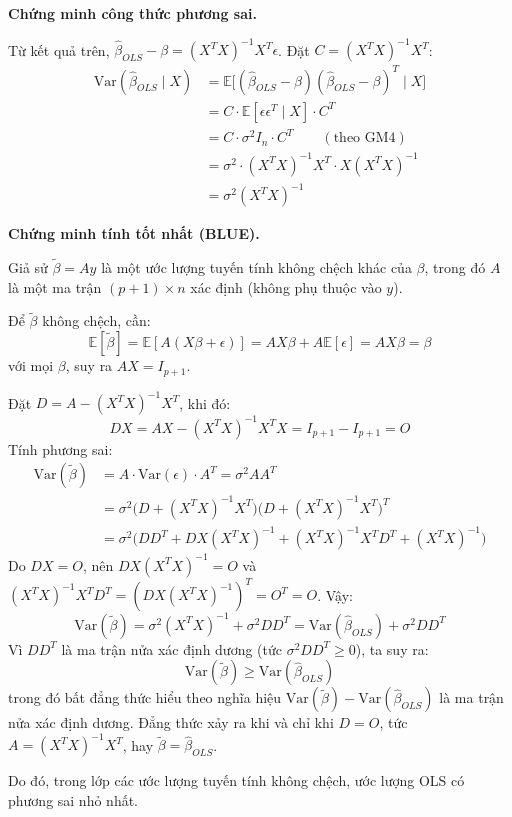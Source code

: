 \documentclass[a4paper]{article}
\begin{document}
\textbf{Chứng minh công thức phương sai.}

Từ kết quả trên, $\hat{\beta}_{OLS} - \beta = (X^TX)^{-1}X^T\epsilon$. Đặt $C = (X^TX)^{-1}X^T$:
\begin{align*}
\text{Var}(\hat{\beta}_{OLS} \mid X) &= \mathbb{E}\bigl[(\hat{\beta}_{OLS} - \beta)(\hat{\beta}_{OLS} - \beta)^T \mid X\bigr] \\
&= C \cdot \mathbb{E}[\epsilon\epsilon^T \mid X] \cdot C^T \\
&= C \cdot \sigma^2 I_n \cdot C^T \qquad (\text{theo GM4}) \\
&= \sigma^2 \cdot (X^TX)^{-1}X^T \cdot X(X^TX)^{-1} \\
&= \sigma^2 (X^TX)^{-1}
\end{align*}

\textbf{Chứng minh tính tốt nhất (BLUE).}

Giả sử $\tilde{\beta} = Ay$ là một ước lượng tuyến tính không chệch khác của $\beta$, trong đó $A$ là một ma trận $(p+1) \times n$ xác định (không phụ thuộc vào $y$).

Để $\tilde{\beta}$ không chệch, cần:
$$\mathbb{E}[\tilde{\beta}] = \mathbb{E}[A(X\beta + \epsilon)] = AX\beta + A\mathbb{E}[\epsilon] = AX\beta = \beta$$
với mọi $\beta$, suy ra $AX = I_{p+1}$.

Đặt $D = A - (X^TX)^{-1}X^T$, khi đó:
$$DX = AX - (X^TX)^{-1}X^TX = I_{p+1} - I_{p+1} = O$$
Tính phương sai:
\begin{align*}
\text{Var}(\tilde{\beta}) &= A \cdot \text{Var}(\epsilon) \cdot A^T = \sigma^2 AA^T \\
&= \sigma^2 \bigl(D + (X^TX)^{-1}X^T\bigr)\bigl(D + (X^TX)^{-1}X^T\bigr)^T \\
&= \sigma^2 \bigl(DD^T + D X(X^TX)^{-1} + (X^TX)^{-1}X^TD^T + (X^TX)^{-1}\bigr)
\end{align*}
Do $DX = O$, nên $D X(X^TX)^{-1} = O$ và $(X^TX)^{-1}X^TD^T = (DX(X^TX)^{-1})^T = O^T = O$. Vậy:
$$\text{Var}(\tilde{\beta}) = \sigma^2(X^TX)^{-1} + \sigma^2 DD^T = \text{Var}(\hat{\beta}_{OLS}) + \sigma^2 DD^T$$
Vì $DD^T$ là ma trận nửa xác định dương (tức $\sigma^2 DD^T \geq 0$), ta suy ra:
$$\text{Var}(\tilde{\beta}) \geq \text{Var}(\hat{\beta}_{OLS})$$
trong đó bất đẳng thức hiểu theo nghĩa hiệu $\text{Var}(\tilde{\beta}) - \text{Var}(\hat{\beta}_{OLS})$ là ma trận nửa xác định dương. Đẳng thức xảy ra khi và chỉ khi $D = O$, tức $A = (X^TX)^{-1}X^T$, hay $\tilde{\beta} = \hat{\beta}_{OLS}$.

Do đó, trong lớp các ước lượng tuyến tính không chệch, ước lượng OLS có phương sai nhỏ nhất. $$
\end{document}
